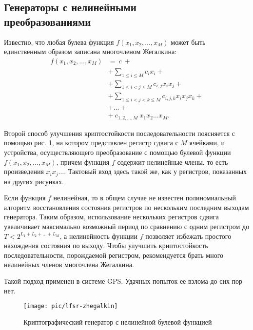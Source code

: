 \subsection[Генераторы с нелинейными преобразованиями]{Генераторы с нелинейными \protect\\ преобразованиями}

Известно, что любая булева функция $f(x_1, x_2,  \dots, x_M)$ может быть единственным образом записана многочленом Жегалкина:
\[ \begin{array}{ll}
    f(x_1, x_2, \dots, x_M) & = ~c~ + \\
    & + \sum\limits_{1 \leq i \leq M} c_i x_i + \\
    & + \sum\limits_{1 \leq i < j \leq M} c_{i,j} x_i x_j + \\
    & + \sum\limits_{1 \leq i < j < k \leq M} c_{i,j,k} x_i x_j x_k + \\
    & + \dots + \\
    & + ~ c_{1,2,\dots,M} ~ x_1 x_2 \dots x_M.
\end{array} \]


Второй способ улучшения криптостойкости последовательности поясняется с помощью рис. \ref{fig:lfsr-zhegalkin}, на котором представлен регистр сдвига с $M$ ячейками, и устройства, осуществляющего преобразование с помощью булевой функции $f(x_1, x_2, \dots, x_M)$, причем функция $f$ содержит нелинейные члены, то есть произведения $x_i x_j \dots$. Тактовый вход здесь такой же, как у регистров, показанных на других рисунках.

Если функция $f$ нелинейная, то в общем случае не известен полиномиальный алгоритм восстановления состояния регистров по нескольким последним выходам генератора. Таким образом, использование нескольких регистров сдвига увеличивает максимально возможный период по сравнению с одним регистром до $T < 2^{L_1 + L_2 + \dots + L_M}$, а нелинейность функции $f$ позволяет избежать простого нахождения состояния по выходу. Чтобы улучшить криптостойкость последовательности, порождаемой  регистром, рекомендуется брать много нелинейных членов многочлена Жегалкина.

Такой подход применен в системе GPS. Удачных попыток ее взлома до сих пор нет.

\begin{figure}[h!]
    \centering
	\texttt{[image: pic/lfsr-zhegalkin]}
    \caption{Криптографический генератор с нелинейной булевой функцией\label{fig:lfsr-zhegalkin}}
\end{figure}
